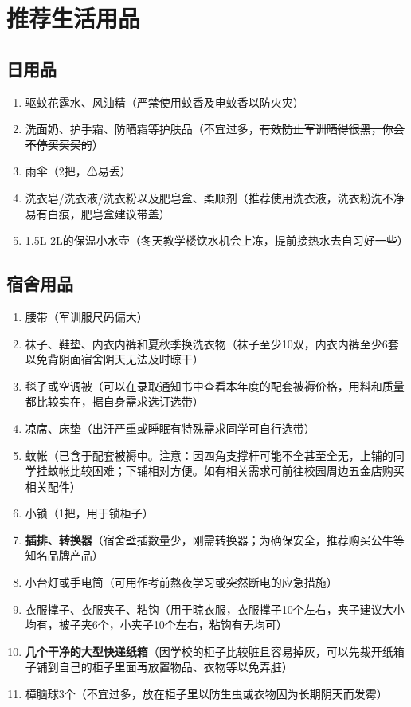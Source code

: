 \section[推荐生活用品]{推荐生活用品}

\subsection[日用品]{日用品}
\begin{enumerate}
      \item 驱蚊花露水、风油精（严禁使用蚊香及电蚊香以防火灾）
      \item 洗面奶、护手霜、防晒霜等护肤品（不宜过多，\sout{有效防止军训晒得很黑，你会不停买买买的}）
      \item 雨伞（2把，⚠易丢）
      \item 洗衣皂/洗衣液/洗衣粉以及肥皂盒、柔顺剂（推荐使用洗衣液，洗衣粉洗不净易有白痕，肥皂盒建议带盖）
      \item 1.5L-2L的保温小水壶（冬天教学楼饮水机会上冻，提前接热水去自习好一些）
\end{enumerate}

\subsection[宿舍用品]{宿舍用品}
\begin{enumerate}
      \item 腰带（军训服尺码偏大）
      \item 袜子、鞋垫、内衣内裤和夏秋季换洗衣物（袜子至少10双，内衣内裤至少6套以免背阴面宿舍阴天无法及时晾干）
      \item 毯子或空调被（可以在录取通知书中查看本年度的配套被褥\footnotemark 价格，用料和质量都比较实在，据自身需求选订选带）
      \item 凉席、床垫\footnotemark（出汗严重或睡眠有特殊需求同学可自行选带）
      \item 蚊帐（已含于配套被褥中。注意：因四角支撑杆可能不全甚至全无，上铺的同学挂蚊帐比较困难；下铺相对方便。如有相关需求可前往校园周边五金店购买相关配件）
      \item 小锁（1把，用于锁柜子）
      \item \textbf{插排、转换器}（宿舍壁插数量少，刚需转换器；为确保安全，推荐购买公牛等知名品牌产品）
      \item 小台灯或手电筒（可用作考前熬夜学习或突然断电的应急措施）
      \item 衣服撑子、衣服夹子、粘钩（用于晾衣服，衣服撑子10个左右，夹子建议大小均有，被子夹6个，小夹子10个左右，粘钩有无均可）
      \item \textbf{几个干净的大型快递纸箱}（因学校的柜子比较脏且容易掉灰，可以先裁开纸箱子铺到自己的柜子里面再放置物品、衣物等以免弄脏）
      \item 樟脑球3个（不宜过多，放在柜子里以防生虫或衣物因为长期阴天而发霉）
\end{enumerate}

